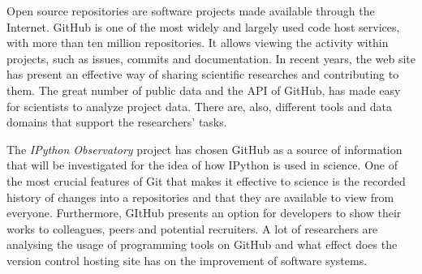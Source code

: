 
Open source repositories are software projects made available through the Internet.\cite{ossWiki}
GitHub is one of the most widely and largely used code host services, with more than ten million repositories.\cite{gitHubWiki}\cite{kalliamvakoupromises} It allows viewing the activity within projects, such as issues, commits and documentation. In recent years, the web site has present an effective way of sharing scientific researches and contributing to them. The great number of public data and the API of GitHub, has made easy for scientists to analyze project data. There are, also, different tools and data domains that support the researchers' tasks.\cite{gandrud2013github}

The \textit{IPython Observatory} project has chosen GitHub as a source of information that will be investigated for the idea of how IPython is used in science. One of the most crucial
features of Git that makes it effective to science is the recorded history of changes into a repositories and that they are available to view from everyone. \cite{ram2013git} Furthermore, GItHub presents an option for developers to show their works to colleagues, peers and potential recruiters. A lot of researchers are analysing the usage of programming tools on GitHub and what effect does the version control hosting site has on the improvement of software systems.  


